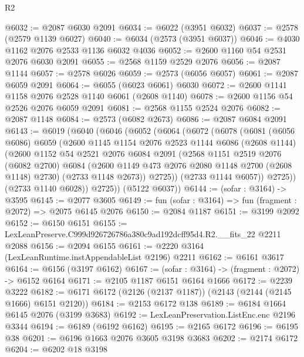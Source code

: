 \begin{lexlean}{R2}
\begin{coremodule}
@6032 := @2087 @6030 @2091
@6034 := @6022 (@3951 @6032)
@6037 := @2578 (@2579 @1139 @6027)
@6040 := @6034 (@2573 (@3951 @6037))
@6046 := @4030 @1162 @2076 @2533 @1136 @6032 @4036
@6052 := @2600 @1160 @54 @2531 @2076 @6030 @2091
@6055 := @2568 @1159 @2529 @2076
@6056 := @2087 @1144
@6057 := @2578 @6026
@6059 := @2573 (@6056 @6057)
@6061 := @2087 @6059 @2091
@6064 := @6055 (@6023 @6061) @6030
@6072 := @2600 @1141 @1158 @2076 @2528 @1140 @6061 (@2608 @1140)
@6078 := @2600 @1156 @54 @2526 @2076 @6059 @2091
@6081 := @2568 @1155 @2524 @2076
@6082 := @2087 @1148
@6084 := @2573 (@6082 @2673)
@6086 := @2087 @6084 @2091
@6143 := @6019
    (@6040
      (@6046
        (@6052
          (@6064
            (@6072
              (@6078
                (@6081
                  (@6056 @6086)
                  @6059
                  (@2600
                    @1145
                    @1154
                    @2076
                    @2523
                    @1144
                    @6086
                    (@2608 @1144)
                    (@2600
                      @1152
                      @54
                      @2521
                      @2076
                      @6084
                      @2091
                      (@2568
                        @1151
                        @2519
                        @2076
                        (@6082 @2700)
                        @6084
                        (@2600 @1149 @473 @2076 @2080 @1148 @2700 (@2608 @1148) @2730)
                        (@2733 @1148 @2673))
                      @2725))
                  (@2733 @1144 @6057))
                @2725))
            (@2733 @1140 @6028))
          @2725))
      (@5122 @6037))
@6144 := (sofar : @3164) -> @3595
@6145 := @2077 @3605
@6149 := fun (sofar : @3164) => fun (fragment : @2072) => @2075 @6145 @2076
@6150 := @2084 @1187
@6151 := @3199 @2092
@6152 := @6150 @6151
@6155 := LexLeanPreserve.C999d926726786a380c9ad192dcff95d4.R2.__fits_22 @2211 @2088
@6156 := @2094 @6155
@6161 := @2220 @3164 (LexLeanRuntime.instAppendableList @2196) @2211
@6162 := @6161 @3617
@6164 := @6156 (@3197 @6162)
@6167 := (sofar : @3164) -> (fragment : @2072) -> @6152 @6164
@6171 := @2105 @1187 @6151 @6164 @1666
@6172 := @2239 @3222
@6182 := @6171 @6172 (@2126 (@2137 @1187)) (@2143 (@2144 (@2145 @1666) @6151 @2120))
@6184 := @2153 @6172 @138
@6189 := @6184 @1664 @6145 @2076 (@3199 @3683)
@6192 := LexLeanPreservation.ListEnc.enc @2196 @3344
@6194 := @6189 (@6192 @6162)
@6195 := @2165 @6172
@6196 := @6195 @38
@6201 := @6196 @1663 @2076 @3605 @3198 @3683
@6202 := @2174 @6172
@6204 := @6202 @18 @3198

\end{coremodule}
\end{lexlean}
